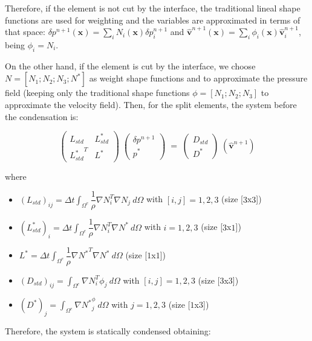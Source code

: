 \documentclass[a4paper,conference]{IEEEtran}
\newcommand{\vv}{\mathbf{v}}
\newcommand{\xx}{\mathbf{x}}
\begin{document}
  Therefore, if the element is not cut by the interface, the traditional lineal shape functions are used for weighting and the variables are approximated in terms of that space: $\delta p^{n+1}(\xx) = \sum_i N_i(\xx) \delta p^{n+1}_i$ and $\hat{\vv}^{n+1}(\xx) = \sum_i \phi_i(\xx) \hat{\vv}^{n+1}_i$, being $\phi_i = N_i$.
  
  On the other hand, if the element is cut by the interface, we choose $N = [N_1; N_2; N_3; N^*]$ as weight shape functions and to approximate the pressure field (keeping only the traditional shape functions $\phi = [N_1; N_2; N_3]$ to approximate the velocity field). Then, for the split elements, the system before the condensation is:
  
  \begin{equation*}
   \begin{pmatrix}
      L_{std} & L_{std}^*\\
      {L_{std}^*}^T & L^*
   \end{pmatrix}\;
    \begin{pmatrix}
      \delta p^{n+1}\\
      p^*
   \end{pmatrix}\; = \;
   \begin{pmatrix}
      D_{std}\\
      D^*
   \end{pmatrix}\;
   (\hat{\vv}^{n+1})   
   \label{poisson}
\end{equation*}

where
\begin{itemize}
 \item ${(L_{std})}_{ij} = \Delta t \int_{\Omega^e} \dfrac{1}{\rho} \nabla N_i^T \nabla N_j \ d\Omega$ with $[i,j] = 1,2,3$ (size [$3$x$3$])
 \item ${(L_{std}^*)}_{i} = \Delta t \int_{\Omega^e} \dfrac{1}{\rho} \nabla N_i^T \nabla N^* \ d\Omega$ with $i = 1,2,3$ (size [$3$x$1$])
 \item $L^* = \Delta t \int_{\Omega^e} \dfrac{1}{\rho} \nabla {N^*}^T \nabla N^* \ d\Omega$ (size [$1$x$1$])
 \item ${(D_{std})}_{ij} = \int_{\Omega^e} \nabla N_i^T \phi_j \ d\Omega$ with $[i,j] = 1,2,3$ (size [$3$x$3$])
 \item ${(D^*)}_{j} = \int_{\Omega^e}  \nabla {N^*}^ \phi_j \ d\Omega$ with $j = 1,2,3$ (size [$1$x$3$])
\end{itemize}
  
  Therefore, the system is statically condensed obtaining:
  
\end{document}
